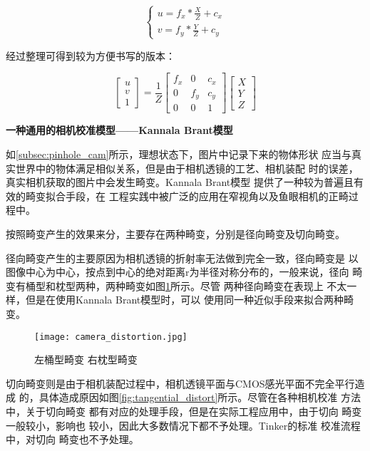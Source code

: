 \begin{equation}
  \begin{cases}
    u = f_x * \frac{X}{Z} + c_x \\
    v = f_y * \frac{Y}{Z} + c_y
  \end{cases}
\end{equation}


经过整理可得到较为方便书写的版本：

$$
\begin{bmatrix}
u \\
v \\
1
\end{bmatrix}
= \frac{1}{Z}
\begin{bmatrix}
  f_x & 0   & c_x \\
    0 & f_y & c_y \\
    0 & 0   &   1
\end{bmatrix}
\begin{bmatrix}
X \\
Y \\
Z
\end{bmatrix}
$$

\textbf{一种通用的相机校准模型——Kannala Brant模型}

如\ref{subsec:pinhole_cam}所示，理想状态下，图片中记录下来的物体形状
应当与真实世界中的物体满足相似关系，但是由于相机透镜的工艺、相机装配
时的误差，真实相机获取的图片中会发生畸变。Kannala Brant模型
\cite{kannala2006generic} 提供了一种较为普遍且有效的畸变拟合手段，在
工程实践中被广泛的应用在窄视角以及鱼眼相机的正畸过程中。

按照畸变产生的效果来分，主要存在两种畸变，分别是径向畸变及切向畸变。

径向畸变产生的主要原因为相机透镜的折射率无法做到完全一致，径向畸变是
以图像中心为中心，按点到中心的绝对距离r为半径对称分布的，一般来说，径向
畸变有桶型和枕型两种，两种畸变如图\ref{fig:radial_distort}所示。尽管
两种径向畸变在表现上 不太一样，但是在使用Kannala Brant模型时，可以
使用同一种近似手段来拟合两种畸变。

\begin{figure}[h] %
  \centering
  \texttt{[image: camera\_distortion.jpg]}
  \caption{左桶型畸变 右枕型畸变}
  \label{fig:radial_distort}
\end{figure}

切向畸变则是由于相机装配过程中，相机透镜平面与CMOS感光平面不完全平行造成
的，具体造成原因如图\ref{fig:tangential_distort}所示。尽管在各种相机校准
方法中，关于切向畸变 都有对应的处理手段，但是在实际工程应用中，由于切向
畸变一般较小，影响也 较小，因此大多数情况下都不予处理。Tinker的标准
校准流程中，对切向 畸变也不予处理。

